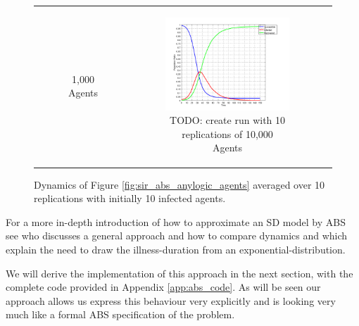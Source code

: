 \begin{figure}
\begin{center}
\begin{tabular}{c c c}
\begin{subfigure}[b]{0.3\textwidth}
			\caption{1,000 Agents}
			\label{fig:sir_abs_agents_repls_1000}
		\end{subfigure}
    	&
		\begin{subfigure}[b]{0.3\textwidth}
			\centering
			\includegraphics[width=1\textwidth, angle=0]{./../shared/fig/frabs/SIR_1000agents_150t_01dt_parallel_10replications.png}
			\caption{TODO: create run with 10 replications of 10,000 Agents}
			\label{fig:sir_abs_agents_repls_10000}
		\end{subfigure}
	\end{tabular}
	
	\caption{Dynamics of Figure \ref{fig:sir_abs_anylogic_agents} averaged over 10 replications with initially 10 infected agents.} 
	\label{fig:sir_abs_agents_repls}
\end{center}
\end{figure}

For a more in-depth introduction of how to approximate an SD model by ABS see \cite{macal_agent-based_2010} who discusses a general approach and how to compare dynamics and \cite{borshchev_system_2004} which explain the need to draw the illness-duration from an exponential-distribution.

We will derive the implementation of this approach in the next section, with the complete code provided in Appendix \ref{app:abs_code}. As will be seen our approach allows us express this behaviour very explicitly and is looking very much like a formal ABS specification of the problem. 